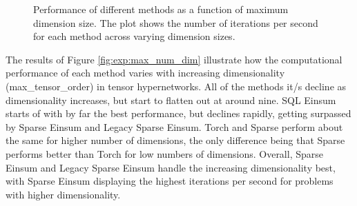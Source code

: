 \begin{figure}[H]
    \caption{Performance of different methods as a function of maximum dimension size.
        The plot shows the number of iterations per second for each method across varying dimension sizes.}
    \label{fig:exp:max_dim_size}
\end{figure}

\noindent
The results of Figure \ref{fig:exp:max_num_dim} illustrate how the computational performance
of each method varies with increasing dimensionality (max\_tensor\_order) in tensor hypernetworks.
All of the methods it/s decline as dimensionality increases, but start to flatten out at around nine.
SQL Einsum starts of with by far the best performance, but declines rapidly, getting surpassed by
Sparse Einsum and Legacy Sparse Einsum. Torch and Sparse perform about the same for higher number
of dimensions, the only difference being that Sparse performs better than Torch for low numbers
of dimensions. Overall, Sparse Einsum and Legacy Sparse Einsum handle the increasing dimensionality
best, with Sparse Einsum displaying the highest iterations per second for problems with higher
dimensionality.

